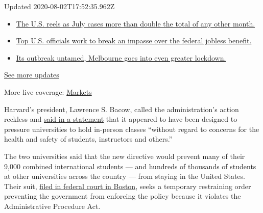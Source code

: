 Updated 2020-08-02T17:52:35.962Z

\begin{itemize}
\tightlist
\item
  \href{https://www.nytimes.com/2020/08/01/world/coronavirus-covid-19.html?action=click\&pgtype=Article\&state=default\&region=MAIN_CONTENT_1\&context=storylines_live_updates\#link-34047410}{The
  U.S. reels as July cases more than double the total of any other
  month.}
\item
  \href{https://www.nytimes.com/2020/08/01/world/coronavirus-covid-19.html?action=click\&pgtype=Article\&state=default\&region=MAIN_CONTENT_1\&context=storylines_live_updates\#link-780ec966}{Top
  U.S. officials work to break an impasse over the federal jobless
  benefit.}
\item
  \href{https://www.nytimes.com/2020/08/01/world/coronavirus-covid-19.html?action=click\&pgtype=Article\&state=default\&region=MAIN_CONTENT_1\&context=storylines_live_updates\#link-2bc8948}{Its
  outbreak untamed, Melbourne goes into even greater lockdown.}
\end{itemize}

\href{https://www.nytimes.com/2020/08/01/world/coronavirus-covid-19.html?action=click\&pgtype=Article\&state=default\&region=MAIN_CONTENT_1\&context=storylines_live_updates}{See
more updates}

More live coverage:
\href{https://www.nytimes.com/live/2020/07/31/business/stock-market-today-coronavirus?action=click\&pgtype=Article\&state=default\&region=MAIN_CONTENT_1\&context=storylines_live_updates}{Markets}

Harvard's president, Lawrence S. Bacow, called the administration's
action reckless and
\href{https://www.harvard.edu/president/news/2020/supporting-international-students?utm_source=twitter\&utm_campaign=hu-twitter-general\&utm_medium=social}{said
in a statement} that it appeared to have been designed to pressure
universities to hold in-person classes ``without regard to concerns for
the health and safety of students, instructors and others.''

The two universities said that the new directive would prevent many of
their 9,000 combined international students --- and hundreds of
thousands of students at other universities across the country --- from
staying in the United States. Their suit,
\href{https://www.harvard.edu/sites/default/files/content/sevp_filing.pdf}{filed
in federal court in Boston}, seeks a temporary restraining order
preventing the government from enforcing the policy because it violates
the Administrative Procedure Act.

